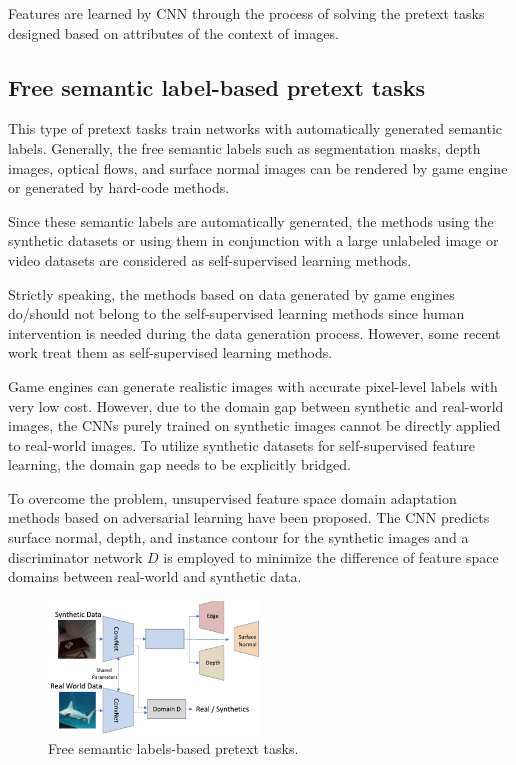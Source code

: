 Features are learned by CNN through the process of solving the pretext tasks
designed based on attributes of the context of images.

\subsection{Free semantic label-based pretext tasks}
This type of pretext tasks train networks with automatically generated semantic
labels. Generally, the free semantic labels such as segmentation masks, depth
images, optical flows, and surface normal images can be rendered by game engine
or generated by hard-code methods.

Since these semantic labels are automatically generated, the methods using the
synthetic datasets or using them in conjunction with a large unlabeled image or
video datasets are considered as self-supervised learning methods.

\begin{note}
      Strictly speaking, the methods based on data generated by game engines
      do/should not belong to the self-supervised learning methods since human
      intervention is needed during the data generation process. However, some
      recent work treat them as self-supervised learning methods.
\end{note}

Game engines can generate realistic images with accurate pixel-level labels with
very low cost. However, due to the domain gap between synthetic and real-world
images, the CNNs purely trained on synthetic images cannot be directly applied
to real-world images. To utilize synthetic datasets for self-supervised feature
learning, the domain gap needs to be explicitly bridged.

To overcome the problem, unsupervised feature space domain adaptation methods
based on adversarial learning have been proposed. The CNN predicts surface normal,
depth, and instance contour for the synthetic images and a discriminator network
$D$ is employed to minimize the difference of feature space domains between
real-world and synthetic data.

\begin{figure}[!ht]
      \centering
      \includegraphics[width=0.5\textwidth]{img/SSL/FreeSemantic.png}
      \caption{Free semantic labels-based pretext tasks.}
      \label{fig:FSL}
\end{figure}

